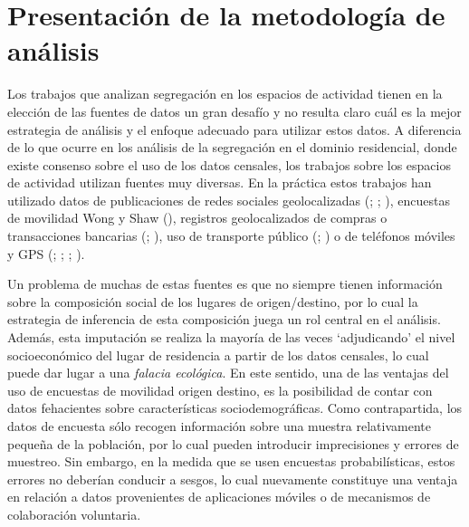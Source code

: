 \documentclass[
  spanish,
  a4paper,%
  chapterprefix=true,%
  DIV=calc,%
  twoside]{scrbook}%
\begin{document}
\section{Presentación de la metodología de análisis}\label{mobilities-method}

Los trabajos que analizan segregación en los espacios de actividad
tienen en la elección de las fuentes de datos un gran desafío y no
resulta claro cuál es la mejor estrategia de análisis y el enfoque
adecuado para utilizar estos datos. A diferencia de lo que ocurre en los
análisis de la segregación en el dominio residencial, donde existe
consenso sobre el uso de los datos censales, los trabajos sobre los
espacios de actividad utilizan fuentes muy diversas. En la práctica
estos trabajos han utilizado datos de publicaciones de redes sociales
geolocalizadas (; ; ), encuestas de
movilidad Wong y Shaw (), registros geolocalizados de compras o transacciones
bancarias (; ), uso de transporte público
(; ) o de teléfonos móviles y GPS (; ; ; ).

Un problema de muchas de estas fuentes es que no siempre tienen
información sobre la composición social de los lugares de
origen/destino, por lo cual la estrategia de inferencia de esta
composición juega un rol central en el análisis. Además, esta imputación
se realiza la mayoría de las veces `adjudicando' el nivel socioeconómico
del lugar de residencia a partir de los datos censales, lo cual puede
dar lugar a una \emph{falacia ecológica}. En este sentido, una de las
ventajas del uso de encuestas de movilidad origen destino, es la
posibilidad de contar con datos fehacientes sobre características
sociodemográficas. Como contrapartida, los datos de encuesta sólo
recogen información sobre una muestra relativamente pequeña de la
población, por lo cual pueden introducir imprecisiones y errores de
muestreo. Sin embargo, en la medida que se usen encuestas
probabilísticas, estos errores no deberían conducir a sesgos, lo cual
nuevamente constituye una ventaja en relación a datos provenientes de
aplicaciones móviles o de mecanismos de colaboración voluntaria.
\end{document}
